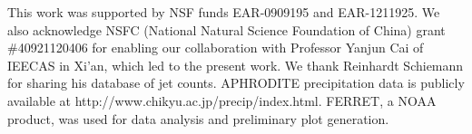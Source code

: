 \documentclass[draft,grl]{AGUTeX}
\begin{document}
\begin{article}

\begin{acknowledgments}
This work was supported by NSF funds EAR-0909195 and EAR-1211925. We also acknowledge NSFC (National Natural Science Foundation of China) grant \#40921120406 for enabling our collaboration with Professor Yanjun Cai of IEECAS in Xi'an, which led to the present work. We thank Reinhardt Schiemann for sharing his database of jet counts. APHRODITE precipitation data is publicly available at http://www.chikyu.ac.jp/precip/index.html. FERRET, a NOAA product, was used for data analysis and preliminary plot generation.
\end{acknowledgments}




%
%
\end{article}
%
%
%
%
%


\begin{figure}
\label{algo}
\end{figure}
\end{document}
